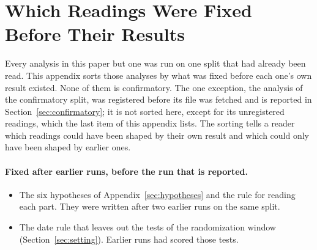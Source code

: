 \section{Which Readings Were Fixed Before Their Results}
\label{sec:analysis-history}
Every analysis in this paper but one was run on one split that had already been read. This appendix sorts those analyses by what was fixed before each one's own result existed. None of them is confirmatory. The one exception, the analysis of the confirmatory split, was registered before its file was fetched and is reported in Section~\ref{sec:confirmatory}; it is not sorted here, except for its unregistered readings, which the last item of this appendix lists. The sorting tells a reader which readings could have been shaped by their own result and which could only have been shaped by earlier ones.

\paragraph{Fixed after earlier runs, before the run that is reported.}
\begin{itemize}
\item The six hypotheses of Appendix~\ref{sec:hypotheses} and the rule for reading each part. They were written after two earlier runs on the same split.
\item The date rule that leaves out the tests of the randomization window (Section~\ref{sec:setting}). Earlier runs had scored those tests.
\end{itemize}

